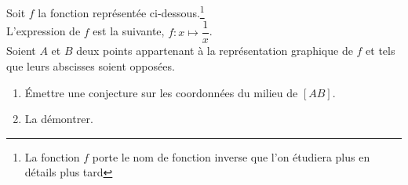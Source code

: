 \exercice Soit $f$ la fonction représentée ci-dessous.\footnote[1]{La fonction $f$ porte le nom de fonction inverse que l'on étudiera plus en détails plus tard}\\ L'expression de $f$ est la suivante, $f : x \mapsto \dfrac{1}{x}$.\\[1em] Soient $A$ et $B$ deux points appartenant à la représentation graphique de $f$ et tels que leurs abscisses soient opposées.

\begin{enumerate}
	\item Émettre une conjecture sur les coordonnées du milieu de $[AB]$.
	\item La démontrer.
\end{enumerate}

\begin{center}
	
\end{center}